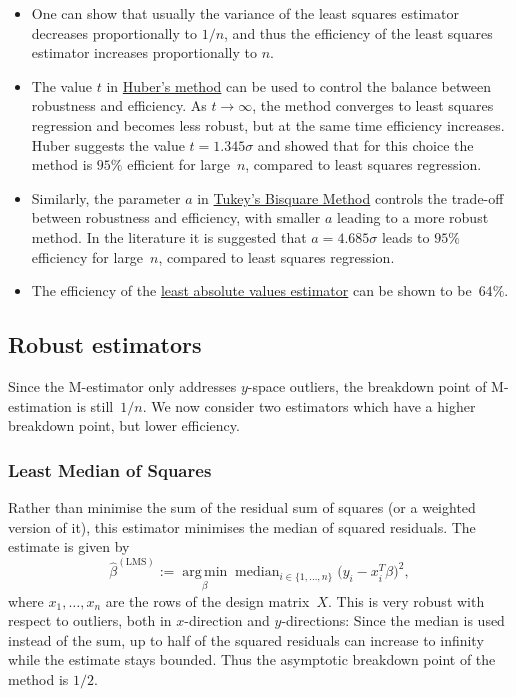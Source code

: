 \documentclass[
  a4paper,
]{article}
\theoremstyle{definition}
\theoremstyle{definition}
\theoremstyle{definition}
\theoremstyle{definition}
\theoremstyle{remark}
\begin{document}
\begin{itemize}
\item
  One can show that usually the variance of the least squares
  estimator decreases proportionally to \(1 / n\), and thus the efficiency of
  the least squares estimator increases proportionally to \(n\).
\item
  The value \(t\) in \hyperref[Huber]{Huber's method} can be used to control
  the balance between robustness and efficiency. As \(t\to\infty\),
  the method converges to least squares regression and becomes
  less robust, but at the same time efficiency increases.
  Huber suggests the value \(t = 1.345\sigma\) and showed that for this
  choice the method is \(95\%\) efficient for large~\(n\), compared
  to least squares regression.
\item
  Similarly, the parameter \(a\) in \hyperref[bisquare]{Tukey's Bisquare Method} controls
  the trade-off between robustness and efficiency, with smaller \(a\) leading
  to a more robust method. In the literature it is suggested that
  \(a = 4.685 \sigma\) leads to \(95\%\) efficiency for large~\(n\), compared to
  least squares regression.
\item
  The efficiency of the \hyperref[exm:LAV]{least absolute values estimator} can be shown
  to be~\(64\%\).
\end{itemize}

\subsection{Robust estimators}\label{robust-estimators}

Since the M-estimator only addresses \(y\)-space outliers, the breakdown point
of M-estimation is still~\(1/n\). We now consider two estimators which have a
higher breakdown point, but lower efficiency.

\subsubsection{Least Median of Squares}\label{LMS}

Rather than minimise the sum of the residual sum of squares (or a weighted
version of it), this estimator minimises the median of squared residuals. The
estimate is given by
\begin{equation*}
  \hat\beta^\mathrm{(LMS)}
  := \mathop{\mathrm{arg\,min}}\limits_\beta \mathop{\mathrm{median}}_{i\in\{1,\ldots,n\}} \bigl( y_i- x_i^T \beta \bigr)^2,
\end{equation*}
where \(x_1, \ldots, x_n\) are the rows of the design matrix~\(X\).
This is very robust with respect to outliers, both in \(x\)-direction and
\(y\)-directions: Since the median is used instead of the sum, up to half
of the squared residuals can increase to infinity while the estimate stays
bounded. Thus the asymptotic breakdown point of the method is \(1/2\).
\end{document}
